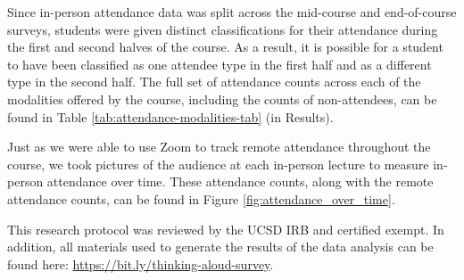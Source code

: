 Since in-person attendance data was split across the mid-course and end-of-course surveys, students were given distinct classifications for their attendance during the first and second halves of the course. As a result, it is possible for a student to have been classified as one attendee type in the first half and as a different type in the second half. The full set of attendance counts across each of the modalities offered by the course, including the counts of non-attendees, can be found in Table \ref{tab:attendance-modalities-tab} (in Results).

Just as we were able to use Zoom to track remote attendance throughout the course, we took pictures of the audience at each in-person lecture to measure in-person attendance over time. These attendance counts, along with the remote attendance counts, can be found in Figure \ref{fig:attendance_over_time}.

This research protocol was reviewed by the UCSD IRB and certified exempt. In addition, all materials used to generate the results of the data analysis can be found here: \url{https://bit.ly/thinking-aloud-survey}.